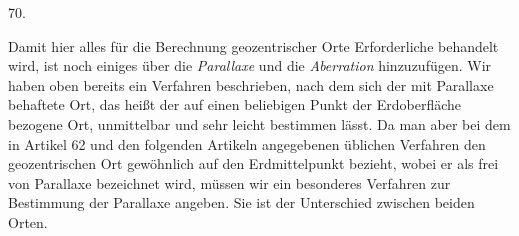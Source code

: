 \par{}\medskip
\hypertarget{native-089-article070}{}
\begin{center}70.\end{center}
Damit hier alles für die Berechnung geozentrischer Orte Erforderliche behandelt wird, ist noch einiges über die \emph{Parallaxe} und die \emph{Aberration} hinzuzufügen. Wir haben oben bereits ein Verfahren beschrieben, nach dem sich der mit Parallaxe behaftete Ort, das heißt der auf einen beliebigen Punkt der Erdoberfläche bezogene Ort, unmittelbar und sehr leicht bestimmen lässt. Da man aber bei dem in Artikel 62 und den folgenden Artikeln angegebenen üblichen Verfahren den geozentrischen Ort gewöhnlich auf den Erdmittelpunkt bezieht, wobei er als frei von Parallaxe bezeichnet wird, müssen wir ein besonderes Verfahren zur Bestimmung der Parallaxe angeben. Sie ist der Unterschied zwischen beiden Orten.

